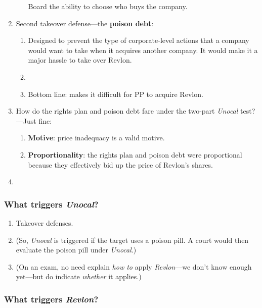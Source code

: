 \begin{enumerate}
\begin{enumerate}
        Board the ability to choose who buys the company.
    \end{enumerate}
    \item Second takeover defense---the \textbf{poison debt}:
    \begin{enumerate}
        \item Designed to prevent the type of corporate-level actions that a 
        company would want to take when it acquires another company. It would 
        make it a major hassle to take over Revlon.
        \item %
        \item Bottom line: makes it difficult for PP to acquire Revlon. 
    \end{enumerate}
    \item How do the rights plan and poison debt fare under the two-part 
    \emph{Unocal} test?---Just fine:
    \begin{enumerate}
        \item \textbf{Motive}: price inadequacy is a valid motive.
        \item \textbf{Proportionality}: the rights plan and poison debt were 
        proportional because they effectively bid up the price of Revlon's 
        shares.
    \end{enumerate}
    \item %
\end{enumerate}

\subsubsection{What triggers \emph{Unocal}?}

\begin{enumerate}
    \item Takeover defenses.
    \item (So, \emph{Unocal} is triggered if the target uses a poison pill. A 
    court would then evaluate the poison pill under \emph{Unocal}.)
    \item (On an exam, no need explain \emph{how to} apply \emph{Revlon}---we 
    don't know enough yet---but do indicate \emph{whether} it applies.)
\end{enumerate}

\subsubsection{What triggers \emph{Revlon}?}

